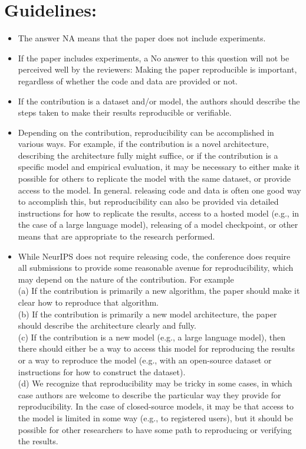 \documentclass[10pt]{article}
\begin{document}
\section*{Guidelines:}
\begin{itemize}
  \item The answer NA means that the paper does not include experiments.
  \item If the paper includes experiments, a No answer to this question will not be perceived well by the reviewers: Making the paper reproducible is important, regardless of whether the code and data are provided or not.
  \item If the contribution is a dataset and/or model, the authors should describe the steps taken to make their results reproducible or verifiable.
  \item Depending on the contribution, reproducibility can be accomplished in various ways. For example, if the contribution is a novel architecture, describing the architecture fully might suffice, or if the contribution is a specific model and empirical evaluation, it may be necessary to either make it possible for others to replicate the model with the same dataset, or provide access to the model. In general. releasing code and data is often one good way to accomplish this, but reproducibility can also be provided via detailed instructions for how to replicate the results, access to a hosted model (e.g., in the case of a large language model), releasing of a model checkpoint, or other means that are appropriate to the research performed.
  \item While NeurIPS does not require releasing code, the conference does require all submissions to provide some reasonable avenue for reproducibility, which may depend on the nature of the contribution. For example\\
(a) If the contribution is primarily a new algorithm, the paper should make it clear how to reproduce that algorithm.\\
(b) If the contribution is primarily a new model architecture, the paper should describe the architecture clearly and fully.\\
(c) If the contribution is a new model (e.g., a large language model), then there should either be a way to access this model for reproducing the results or a way to reproduce the model (e.g., with an open-source dataset or instructions for how to construct the dataset).\\
(d) We recognize that reproducibility may be tricky in some cases, in which case authors are welcome to describe the particular way they provide for reproducibility. In the case of closed-source models, it may be that access to the model is limited in some way (e.g., to registered users), but it should be possible for other researchers to have some path to reproducing or verifying the results.
\end{itemize}
\end{document}
